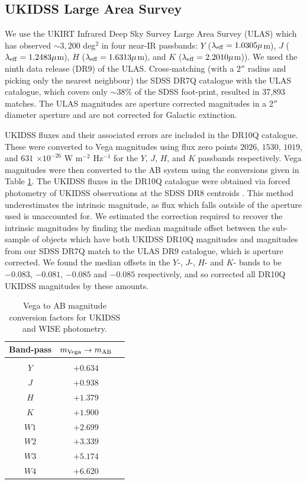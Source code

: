 \subsection{UKIDSS Large Area Survey}

We use the UKIRT Infrared Deep Sky Survey \citep[UKIDSS;][]{lawrence07} Large Area Survey (ULAS) which has observed $\sim 3,200$ deg$^2$ in four near-IR passbands: $Y$ ($\lambda_{\rm eff} = 1.0305\mu$m), $J$ ($\lambda_{\rm eff} = 1.2483\mu$m), $H$ ($\lambda_{\rm eff} = 1.6313\mu$m), and $K$ ($\lambda_{\rm eff} = 2.2010\mu$m)). We used the ninth data release (DR9) of the ULAS. Cross-matching (with a 2$''$ radius and picking only the nearest neighbour) the SDSS DR7Q catalogue with the ULAS catalogue, which covers only $\sim 38$\% of the SDSS foot-print, resulted in 37,893 matches. The ULAS magnitudes are aperture corrected magnitudes in a 2$''$ diameter aperture and are not corrected for Galactic extinction.

UKIDSS fluxes and their associated errors are included in the DR10Q catalogue. These were converted to Vega magnitudes using flux zero points $2026$, $1530$, $1019$, and $631$ $\times10^{-26}$ W m$^{-2}$ Hz$^{-1}$ for the $Y$, $J$, $H$, and $K$ passbands respectively. Vega magnitudes were then converted to the AB system using the conversions given in Table \ref{tab:magconversions}. The UKIDSS fluxes in the DR10Q catalogue were obtained via forced photometry of UKIDSS observations at the SDSS DR8 centroids \citep{aihara11}. This method underestimates the intrinsic magnitude, as flux which falls outside of the aperture used is unaccounted for. We estimated the correction required to recover the intrinsic magnitudes by finding the median magnitude offset between the sub-sample of objects which have both UKIDSS DR10Q magnitudes and magnitudes from our SDSS DR7Q match to the ULAS DR9 catalogue, which is aperture corrected. We found the median offsets in the $Y$-, $J$-, $H$- and $K$- bands to be $-0.083$, $-0.081$, $-0.085$ and $-0.085$ respectively, and so corrected all DR10Q UKIDSS magnitudes by these amounts. 

\begin{table}
  \centering
  \begin{tabular}{c c c}
    \hline
    Band-pass & $m_{\rm Vega} \rightarrow m_{\rm AB}$ \\
    \hline \\
    $Y$ & $+0.634$ \\
    $J$ & $+0.938$ \\
    $H$ & $+1.379$ \\
    $K$ & $+1.900$ \\
    $W1$ & $+2.699$ \\
    $W2$ & $+3.339$ \\
    $W3$ & $+5.174$ \\
    $W4$ & $+6.620$ \\
    \hline
  \end{tabular}
  \caption{Vega to AB magnitude conversion factors for UKIDSS \citep{hewett06} and WISE \citep{cutri13} photometry.}
  \label{tab:magconversions}
\end{table}

